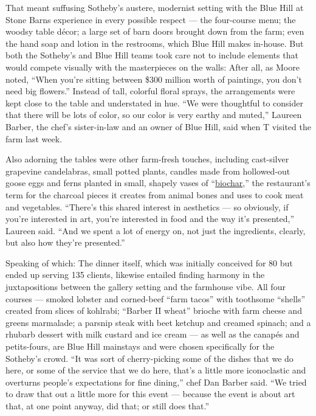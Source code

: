 That meant suffusing Sotheby's austere, modernist setting with the Blue
Hill at Stone Barns experience in every possible respect --- the
four-course menu; the woodsy table décor; a large set of barn doors
brought down from the farm; even the hand soap and lotion in the
restrooms, which Blue Hill makes in-house. But both the Sotheby's and
Blue Hill teams took care not to include elements that would compete
visually with the masterpieces on the walls: After all, as Moore noted,
``When you're sitting between \$300 million worth of paintings, you
don't need big flowers.'' Instead of tall, colorful floral sprays, the
arrangements were kept close to the table and understated in hue. ``We
were thoughtful to consider that there will be lots of color, so our
color is very earthy and muted,'' Laureen Barber, the chef's
sister-in-law and an owner of Blue Hill, said when T visited the farm
last week.

Also adorning the tables were other farm-fresh touches, including
cast-silver grapevine candelabras, small potted plants, candles made
from hollowed-out goose eggs and ferns planted in small, shapely vases
of
``\href{http://www.stonebarnscenter.org/about-us/blue-hill-at-stone-barns.html}{biochar},''
the restaurant's term for the charcoal pieces it creates from animal
bones and uses to cook meat and vegetables. ``There's this shared
interest in aesthetics --- so obviously, if you're interested in art,
you're interested in food and the way it's presented,'' Laureen said.
``And we spent a lot of energy on, not just the ingredients, clearly,
but also how they're presented.''

Speaking of which: The dinner itself, which was initially conceived for
80 but ended up serving 135 clients, likewise entailed finding harmony
in the juxtapositions between the gallery setting and the farmhouse
vibe. All four courses --- smoked lobster and corned-beef ``farm tacos''
with toothsome ``shells'' created from slices of kohlrabi; ``Barber II
wheat'' brioche with farm cheese and greens marmalade; a parsnip steak
with beet ketchup and creamed spinach; and a rhubarb dessert with milk
custard and ice cream --- as well as the canapés and petits-fours, are
Blue Hill mainstays and were chosen specifically for the Sotheby's
crowd. ``It was sort of cherry-picking some of the dishes that we do
here, or some of the service that we do here, that's a little more
iconoclastic and overturns people's expectations for fine dining,'' chef
Dan Barber said. ``We tried to draw that out a little more for this
event --- because the event is about art that, at one point anyway, did
that; or still does that.''

